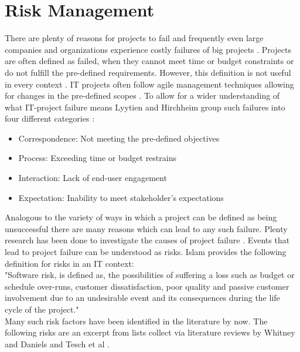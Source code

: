 \section{Risk Management}
\label{sec:theoryA}

There are plenty of reasons for projects to fail and frequently even large companies and organizations experience costly failures of big projects \cite{dwivediResearchInformationSystems2015}. Projects are often defined as failed, when they cannot meet time or budget constraints or do not fulfill the pre-defined requirements. However, this definition is not useful in every context \cite{debakkerDoesRiskManagement2010}. IT projects often follow agile management techniques allowing for changes in the pre-defined scopes \cite{kusay-merkleAgilesProjektmanagementIm2018}. To allow for a wider understanding of what IT-project failure means Lyytien and Hirchheim group such failures into four different categories \cite{lyytinenInformationSystemsFailures1988}: 
\begin{itemize}
	\item Correspondence: Not meeting the pre-defined objectives
	\item Process: Exceeding time or budget restrains
	\item Interaction: Lack of end-user engagement
	\item Expectation: Inability to meet stakeholder's expectations
\end{itemize}	
Analogous to the variety of ways in which a project can be defined as being unsuccessful there are many reasons which can lead to any such failure. Plenty research has been done to investigate the causes of project failure \cite{guptaSystematicLiteratureReview2018}.  Events that lead to project failure can be understood as risks. Islam \cite{islamSoftwareDevelopmentRisk2011} provides the following definition for risks in an IT context:\\
"Software risk, is defined as, the possibilities of suffering a loss such as budget or schedule over-runs, customer dissatisfaction, poor quality and passive customer involvement due to an undesirable event and its consequences during the life cycle of the project."\\
Many such risk factors have been identified in the literature by now. The following risks are an excerpt from lists collect via literature reviews by Whitney and Daniels \cite{whitneyRootCauseFailure2013} and Tesch et al \cite{teschITProjectRisk2007}. 

